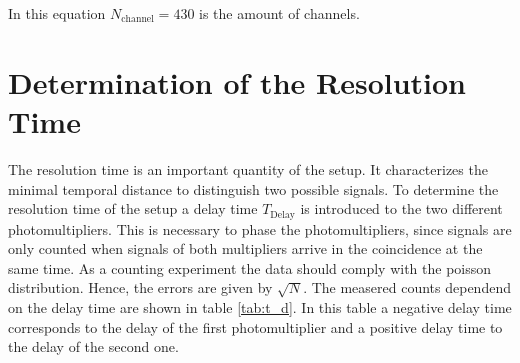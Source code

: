 In this equation $N_\mathrm{channel} = 430$ is the amount of channels.

\section{Determination of the Resolution Time}
\label{sec:resoltion time}
The resolution time is an important quantity of the setup. It characterizes the minimal temporal distance to distinguish two possible signals.
To determine the resolution time of the setup a delay time $T_\mathrm{Delay}$ is introduced to the two different photomultipliers. This is necessary to phase the photomultipliers,
since signals are only counted when signals of both multipliers arrive in the coincidence at the same time. As a counting experiment the data should comply with the poisson distribution. Hence, the errors are given 
by $\sqrt{N}$. The measered counts dependend on the delay time are shown in table \ref{tab:t_d}. In this table a negative delay time corresponds to the delay of the first 
photomultiplier and a positive delay time to the delay of the second one. 

